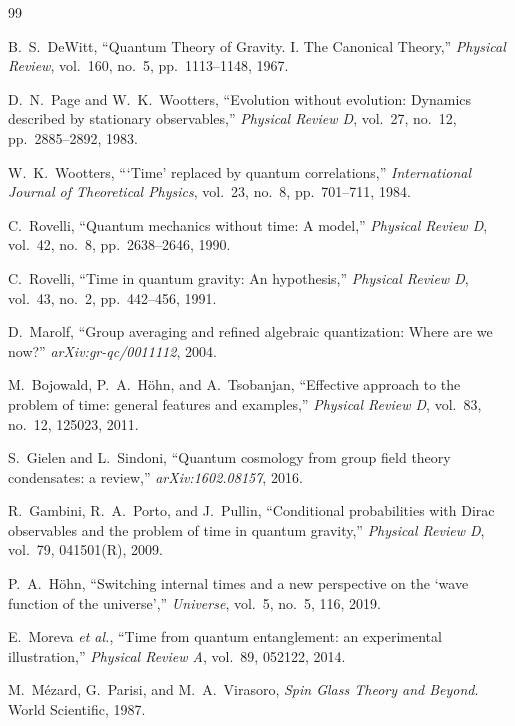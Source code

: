\documentclass[12pt,a4paper]{article}
\theoremstyle{definition}
\begin{document}
\begin{thebibliography}{99}

B.~S.~DeWitt, ``Quantum Theory of Gravity. I. The Canonical Theory,''
\emph{Physical Review}, vol.~160, no.~5, pp.~1113--1148, 1967.

D.~N.~Page and W.~K.~Wootters, ``Evolution without evolution: Dynamics described by stationary observables,''
\emph{Physical Review D}, vol.~27, no.~12, pp.~2885--2892, 1983.

W.~K.~Wootters, ```Time' replaced by quantum correlations,''
\emph{International Journal of Theoretical Physics}, vol.~23, no.~8, pp.~701--711, 1984.

C.~Rovelli, ``Quantum mechanics without time: A model,''
\emph{Physical Review D}, vol.~42, no.~8, pp.~2638--2646, 1990.

C.~Rovelli, ``Time in quantum gravity: An hypothesis,''
\emph{Physical Review D}, vol.~43, no.~2, pp.~442--456, 1991.

D.~Marolf, ``Group averaging and refined algebraic quantization: Where are we now?''
\emph{arXiv:gr-qc/0011112}, 2004.

M.~Bojowald, P.~A.~H\"ohn, and A.~Tsobanjan, ``Effective approach to the problem of time: general features and examples,''
\emph{Physical Review D}, vol.~83, no.~12, 125023, 2011.

S.~Gielen and L.~Sindoni, ``Quantum cosmology from group field theory condensates: a review,''
\emph{arXiv:1602.08157}, 2016.

R.~Gambini, R.~A.~Porto, and J.~Pullin, ``Conditional probabilities with Dirac observables and the problem of time in quantum gravity,''
\emph{Physical Review D}, vol.~79, 041501(R), 2009.

P.~A.~H\"ohn, ``Switching internal times and a new perspective on the `wave function of the universe',''
\emph{Universe}, vol.~5, no.~5, 116, 2019.

E.~Moreva \emph{et al.}, ``Time from quantum entanglement: an experimental illustration,''
\emph{Physical Review A}, vol.~89, 052122, 2014.

M.~M\'ezard, G.~Parisi, and M.~A.~Virasoro, \emph{Spin Glass Theory and Beyond}.
World Scientific, 1987.


\end{thebibliography}
\end{document}
